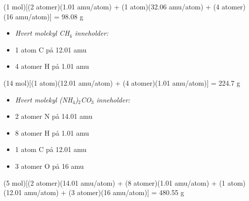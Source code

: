 (1 mol)[(2 atomer)(1.01 amu/atom) + (1 atom)(32.06 amu/atom) + (4 atomer)(16 amu/atom)] = 98.08 g

\vskip 10pt

\begin{itemize} 
\item{} {\it Hvert molekyl CH$_{4}$ inneholder:}
\item{} 1 atom C på 12.01 amu
\item{} 4 atomer H på 1.01 amu
\end{itemize} 

(14 mol)[(1 atom)(12.01 amu/atom) + (4 atomer)(1.01 amu/atom)] = 224.7 g

\vskip 10pt

\begin{itemize} 
\item{} {\it Hvert molekyl (NH$_{4}$)$_{2}$CO$_{3}$ inneholder:}
\item{} 2 atomer N på 14.01 amu
\item{} 8 atomer H på 1.01 amu
\item{} 1 atom C på 12.01 amu
\item{} 3 atomer O på 16 amu
\end{itemize} 

(5 mol)[(2 atomer)(14.01 amu/atom) + (8 atomer)(1.01 amu/atom) + (1 atom)(12.01 amu/atom) + (3 atomer)(16 amu/atom)] = 480.55 g










